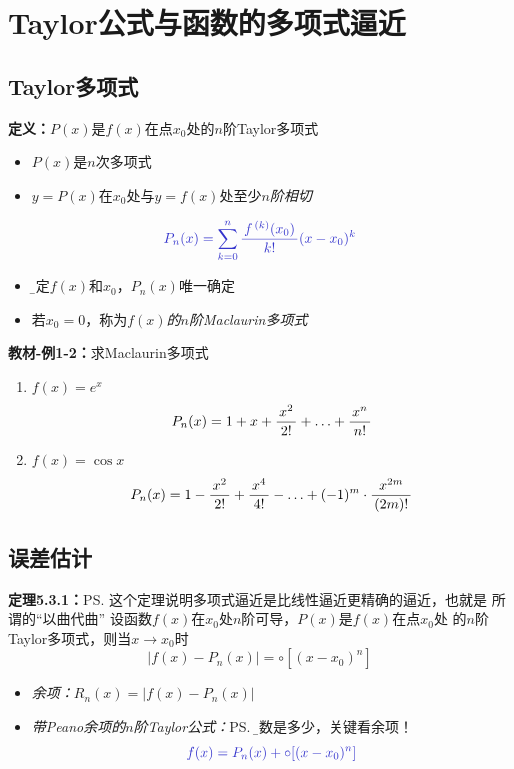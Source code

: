 \section{Taylor公式与函数的多项式逼近}

\subsection{Taylor多项式}

{\bf 定义：}$P(x)$是$f(x)$在点$x_0$处的$n$阶Taylor多项式
\begin{itemize}
  \setlength{\itemindent}{1cm}
  \item $P(x)$是$n$次多项式 
  \item $y=P(x)$在$x_0$处与$y=f(x)$处至少{\it $n$阶相切} 
\end{itemize}

$${\b P_n(x)=\sum\limits_{k=0}^n\df{f^{\,(k)}(x_0)}{k!}(x-x_0)^k}$$
\begin{itemize} 
  \item {\b 给定$f(x)$和$x_0$，$P_n(x)$唯一确定} 
  \item 若$x_0=0$，称为{\it $f(x)$的$n$阶Maclaurin多项式}
\end{itemize}

{\bf 教材-例1-2：}求Maclaurin多项式
\begin{enumerate}[(1)]
  \setlength{\itemindent}{1cm}
  \item $f(x)=e^x$ 
  $${P_n(x)=1+x+\displaystyle\frac{\,{x^2}\,}{\,{2!}\,}+\ldots+\displaystyle\frac{\,{x^n}\,}{\,{n!}\,}}$$ 
  \item $f(x)=\cos x$ 
  $${P_n(x)=1-\displaystyle\frac{\,{x^2}\,}{\,{2!}\,}+\displaystyle\frac{\,{x^4}\,}{\,{4!}\,}-\ldots+(-1)^m\cdot\displaystyle\frac{\,{x^{2m}}\,}{\,{(2m)!}\,}}$$
\end{enumerate}

\subsection{误差估计}

{\bf 定理5.3.1：}\ps{这个定理说明多项式逼近是比线性逼近更精确的逼近，也就是
所谓的“以曲代曲”}
设函数$f(x)$在$x_0$处$n$阶可导，$P(x)$是$f(x)$在点$x_0$处
的$n$阶Taylor多项式，则当$x\to x_0$时
$${|f(x)-P_n(x)|=\circ[(x-x_0)^n]}$$

\begin{itemize}
  \setlength{\itemindent}{1cm}
  \item {\it 余项：}$R_n(x)=|f(x)-P_n(x)|$ 
  \item {\it 带Peano余项的$n$阶Taylor公式：}\ps{\b 阶数是多少，关键看余项！}
  $${\b f(x)=P_n(x)+\circ[(x-x_0)^n]}$$
\end{itemize}

